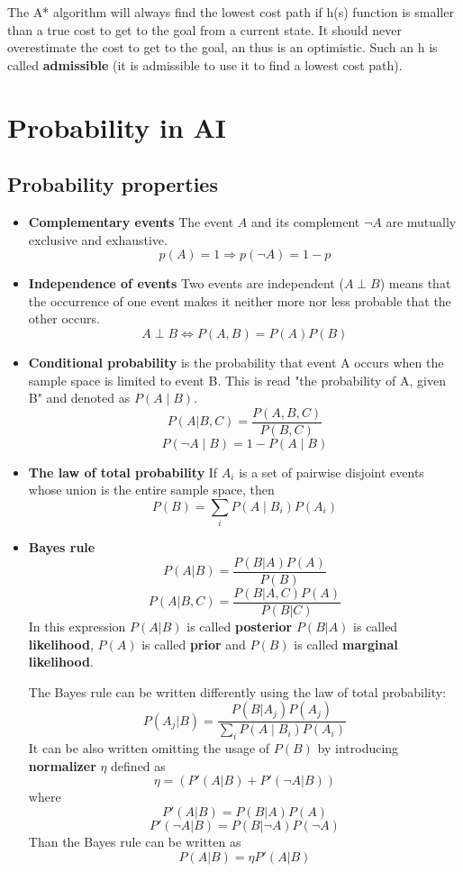 \documentclass[a4paper,10pt]{article}
\begin{document}
The A* algorithm will always find the lowest cost path if h(s) function is smaller than a true cost to get to the goal from a current state. It should never overestimate the cost to get to the goal, an thus is an  optimistic. Such an h is called \textbf{admissible} (it is admissible to use it to find a lowest cost path). 

\section{Probability in AI}

\subsection{Probability properties}
\begin{itemize}
\item \textbf{Complementary events} The event $A$ and its complement $\neg A$ are mutually exclusive and exhaustive.
\[p(A) = 1 \Rightarrow p(\neg A) = 1-p \]
\item \textbf{Independence of events} Two events are independent ($A\perp B$) means that the occurrence of one event makes it neither more nor less probable that the other occurs.
\[ A\perp B \iff P(A,B) = P(A)P(B) \]
\item \textbf{Conditional probability} is the probability that event A occurs when the sample space is limited to event B. This is read "the probability of A, given B" and denoted as $P(A\mid B)$.
\[P(A|B,C) = \frac{P(A,B,C)}{P(B,C)} \]
\[P(\neg A\mid B) = 1-P(A \mid B) \]
\item \textbf{The law of total probability}
If $A_i$ is a set of pairwise disjoint events whose union is the entire sample space, then
\[P(B) = \sum_{i} P(A \mid B_i)P(A_i) \]
\item \textbf{Bayes rule}
\[ P(A|B) = \frac{P(B|A)P(A)}{P(B)} \]
\[ P(A|B,C) = \frac{P(B|A,C)P(A)}{P(B|C)} \]
In this expression $P(A|B)$ is called \textbf{posterior} $P(B|A)$ is called \textbf{likelihood}, $P(A)$ is called \textbf{prior} and $P(B)$ is called \textbf{marginal likelihood}. 

The Bayes rule can be written differently using the law of total probability:
\[ P(A_j|B) = \frac{P(B|A_j)P(A_j)}{\sum_{i} P(A \mid B_i)P(A_i)} \]
It can be also written omitting the usage of $P(B)$ by introducing \textbf{normalizer} $\eta$ defined as
\[ \eta =(P'(A|B)+P'(\neg A|B)) \]
where
\[ P'(A|B) = P(B|A)P(A) \]
\[ P'(\neg A|B) = P(B|\neg A)P(\neg A)\]
Than the Bayes rule can be written as
\[ P(A|B) = \eta P'(A|B) \]


\end{itemize}
\end{document}
